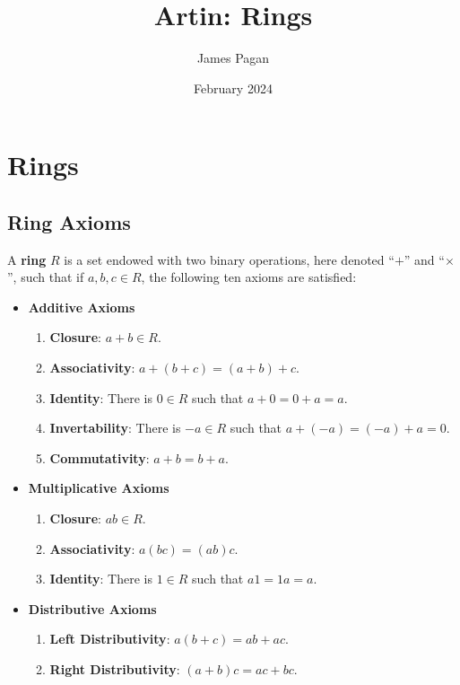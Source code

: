 \documentclass[11pt]{article}
\title{Artin: Rings}
\author{James Pagan}
\date{February 2024}
\begin{document}
\maketitle
\tableofcontents
\newpage


\section{Rings}


\subsection{Ring Axioms}

A \textbf{ring} $R$ is a set endowed with two binary operations, here denoted ``$+$'' and ``$\times$'', such that if $a, b, c \in R$, the following ten axioms are satisfied:

\begin{itemize}
	\item \textbf{Additive Axioms}
	\begin{enumerate}
		\item \textbf{Closure}: $a + b \in R$.
		\item \textbf{Associativity}: $a + (b + c) = (a + b) + c$.
		\item \textbf{Identity}: There is $0 \in R$ such that $a + 0 = 0 + a = a$.
		\item \textbf{Invertability}: There is $-a \in R$ such that $a + (-a) = (-a) + a = 0$.
		\item \textbf{Commutativity}: $a + b = b + a$.
	\end{enumerate}
	\item \textbf{Multiplicative Axioms}
	\begin{enumerate}\addtocounter{enumi}{5}
		\item \textbf{Closure}: $ab \in R$.
		\item \textbf{Associativity}: $a(bc) = (ab)c$.
		\item \textbf{Identity}: There is $1 \in R$ such that $a1 = 1a = a$.
	\end{enumerate}
	\item \textbf{Distributive Axioms}
	\begin{enumerate}\addtocounter{enumi}{8}
		\item \textbf{Left Distributivity}: $a(b + c) = ab + ac$.
		\item \textbf{Right Distributivity}: $(a + b)c = ac + bc$.
	\end{enumerate}
\end{itemize}
\end{document}
